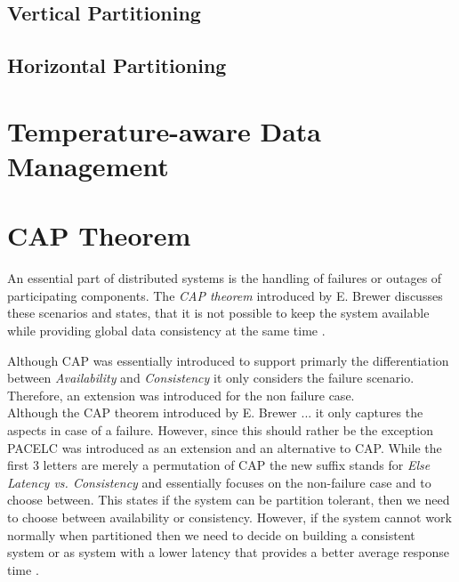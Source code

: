 \subsection{Vertical Partitioning}
\subsection{Horizontal Partitioning}

\section{Temperature-aware Data Management}




\section{CAP Theorem}
\label{sec:cap}
An essential part of distributed systems is the handling of failures or outages of participating components. 
The \emph{CAP theorem} \cite{brewer:2000} introduced by E. Brewer discusses these scenarios and states, that it is not possible 
to keep the system available while providing global data consistency at the same time \cite{cap2002}. 


Although CAP was essentially introduced to support primarly the differentiation between \emph{Availability} and \emph{Consistency} it only considers the failure scenario.
Therefore, an extension was introduced for the non failure case.
\\
Although the CAP theorem introduced by E. Brewer ... it only captures the aspects in case of a failure.
However, since this should rather be the exception PACELC was introduced  as an extension and an alternative to CAP. While the first 3 letters are merely a permutation of CAP
the new suffix stands for \emph{Else Latency vs. Consistency} and essentially focuses on the non-failure case and to choose between.
This states if the system can be partition tolerant, then we need to choose between availability or consistency. However, if the system cannot
work normally when partitioned then we need to decide on building a consistent system or as system with a lower latency that provides a better average response time \cite{abadi2012}.






